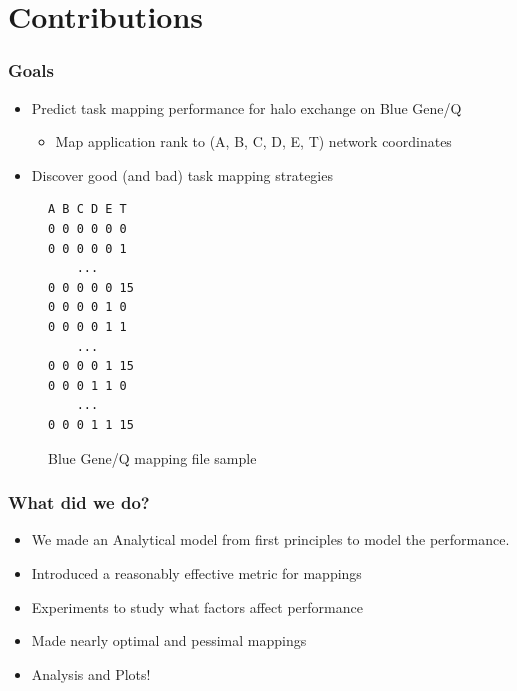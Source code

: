 \documentclass{beamer}
\begin{document}
\section{Contributions}
\begin{frame}[fragile]
\frametitle{Goals}
\begin{itemize}
  \item Predict task mapping performance for halo exchange on Blue Gene/Q
  \begin{itemize}
    \item Map application rank to (A, B, C, D, E, T) network coordinates
  \end{itemize}
  \item Discover good (and bad) task mapping strategies
\end{itemize}
\begin{figure}
  \centering
  \caption{Blue Gene/Q mapping file sample}
  \begin{lstlisting}[basicstyle=\footnotesize\ttfamily, frame=lines,columns=fixed]
A B C D E T
0 0 0 0 0 0
0 0 0 0 0 1
    ...
0 0 0 0 0 15
0 0 0 0 1 0
0 0 0 0 1 1
    ...
0 0 0 0 1 15
0 0 0 1 1 0
    ...
0 0 0 1 1 15
  \end{lstlisting}
\end{figure}
\end{frame}

\begin{frame}
\frametitle{What did we do?}
\begin{itemize}
\item We made an Analytical model from first principles to model the performance.
\item Introduced a reasonably effective metric for mappings
\item Experiments to study what factors affect performance
\item Made nearly optimal and pessimal mappings
\item Analysis and Plots!
\end{itemize}
\end{frame}

\end{document}
